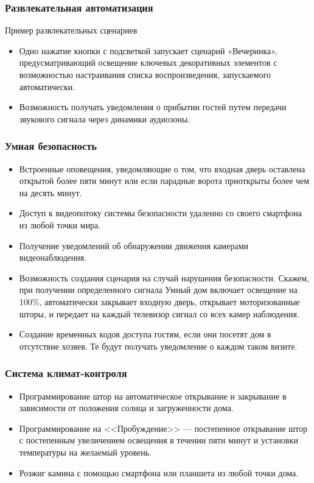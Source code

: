 \documentclass[a4paper,14pt]{extarticle}
\begin{document}
\subsubsection*{Развлекательная автоматизация}
Пример развлекательных сценариев
\begin{itemize}
	\item  Одно нажатие кнопки с подсветкой запускает сценарий «Вечеринка», предусматривающий освещение ключевых декоративных элементов с возможностью настраивания списка воспроизведения, запускаемого автоматически.
	\item Возможность получать уведомления о прибытии гостей путем передачи звукового сигнала через динамики аудиозоны.
\end{itemize}
\subsubsection*{Умная безопасность}
\begin{itemize}
	\item Встроенные оповещения, уведомляющие о том, что входная дверь оставлена открытой более пяти минут или если парадные ворота приоткрыты более чем на десять минут.
	\item  Доступ к видеопотоку системы безопасности удаленно со своего смартфона из любой точки мира.
	\item Получение уведомлений об обнаружении движения камерами видеонаблюдения.
	\item Возможность создания сценария на случай нарушения безопасности. Скажем, при получении определенного сигнала Умный дом включает освещение на 100\%, автоматически закрывает входную дверь, открывает моторизованные шторы, и передает на каждый телевизор сигнал со всех камер наблюдения.
	\item Создание временных кодов доступа гостям, если они посетят дом в отсутствие хозяев. Те будут получать уведомление о каждом таком визите.
\end{itemize}
\subsubsection*{Система климат-контроля}
\begin{itemize}
	\item Программирование штор на автоматическое открывание и закрывание в зависимости от положения солнца и загруженности дома.
	\item Программирование на <<Пробуждение>> --- постепенное открывание штор с постепенным увеличением освещения в течении пяти минут и установки температуры на желаемый уровень.
	\item Розжиг камина с помощью смартфона или планшета из любой точки дома.
\end{itemize}
\end{document}
